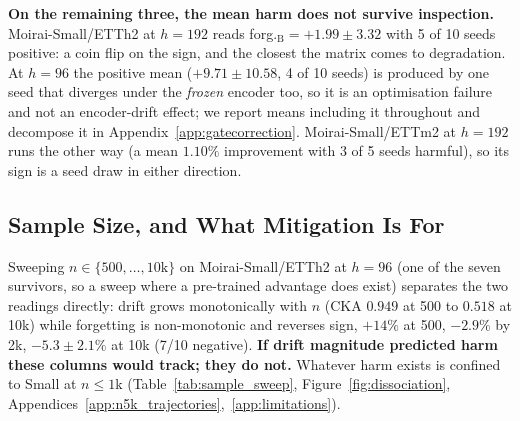 \textbf{On the remaining three, the mean harm does not survive inspection.}
Moirai-Small/ETTh2 at $h{=}192$ reads forg.$_\text{B}{=}{+}1.99{\pm}3.32$ with 5 of
10 seeds positive: a coin flip on the sign, and the closest the matrix comes to
degradation.  At $h{=}96$ the positive mean ($+9.71{\pm}10.58$, 4 of 10 seeds) is
produced by one seed that diverges under the \emph{frozen} encoder too, so it is an
optimisation failure and not an encoder-drift effect; we report means including it
throughout and decompose it in Appendix~\ref{app:gatecorrection}.
Moirai-Small/ETTm2 at $h{=}192$ runs the other way (a mean $1.10\%$ improvement
with 3 of 5 seeds harmful), so its sign is a seed draw in either direction.

\subsection{Sample Size, and What Mitigation Is For}
\label{sec:forecasting:replication}

Sweeping $n{\in}\{500,\ldots,10\mathrm{k}\}$ on Moirai-Small/ETTh2 at $h{=}96$
(one of the seven survivors, so a sweep where a pre-trained advantage does
exist) separates the two readings directly: drift grows monotonically with $n$
(CKA $0.949$ at 500 to $0.518$ at 10k) while forgetting is non-monotonic and
reverses sign, $+14\%$ at 500, $-2.9\%$ by 2k, $-5.3{\pm}2.1\%$ at 10k (7/10
negative). \textbf{If drift magnitude predicted harm these columns would track;
they do not.}  Whatever harm exists is confined to Small at $n{\leq}1$k
(Table~\ref{tab:sample_sweep}, Figure~\ref{fig:dissociation},
Appendices~\ref{app:n5k_trajectories},~\ref{app:limitations}).

